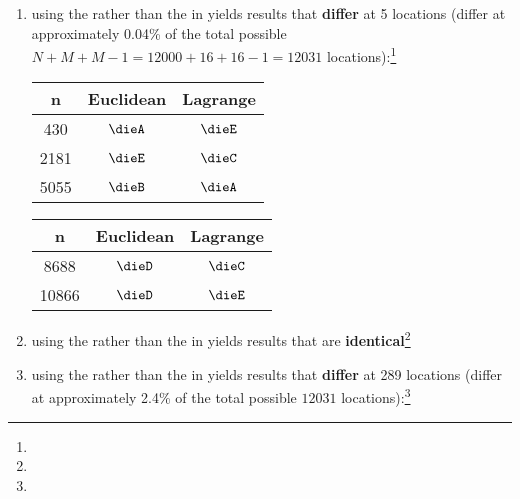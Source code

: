 \begin{example}
\begin{enumerate}
\begin{enumerate}
      \item using the  rather than the  in 
             yields results that \textbf{differ} at 5 locations
            (differ at approximately 0.04\% of the total possible 
            $N+M+M-1=12000+16+16-1=12031$ locations):\footnote{} %
            \\\indentx\begin{tabstr}{0.75}\begin{tabular}[t]{|c|c|c|}
                         \hline
                           n   & Euclidean & Lagrange
                         \\\hline
                              430 & $\dieA$ & $\dieE$
                         \\  2181 & $\dieE$ & $\dieC$
                         \\  5055 & $\dieB$ & $\dieA$
                         \\\hline
                       \end{tabular}\end{tabstr}
              \indentx\begin{tabstr}{0.75}\begin{tabular}[t]{|c|c|c|}
                         \hline
                           n   & Euclidean & Lagrange
                         \\\hline
                             8688 & $\dieD$ & $\dieC$
                         \\ 10866 & $\dieD$ & $\dieE$
                         \\\hline
                       \end{tabular}\end{tabstr}

      \item using the  rather than the  in 
             yields results that are 
            \textbf{identical}\footnote{} %

      \item using the  rather than the  in 
             yields results that \textbf{differ} at 289 locations
            (differ at approximately 2.4\% of the total possible 
            $12031$ locations):\footnote{} %
    \end{enumerate}


\end{enumerate}
\end{example}
